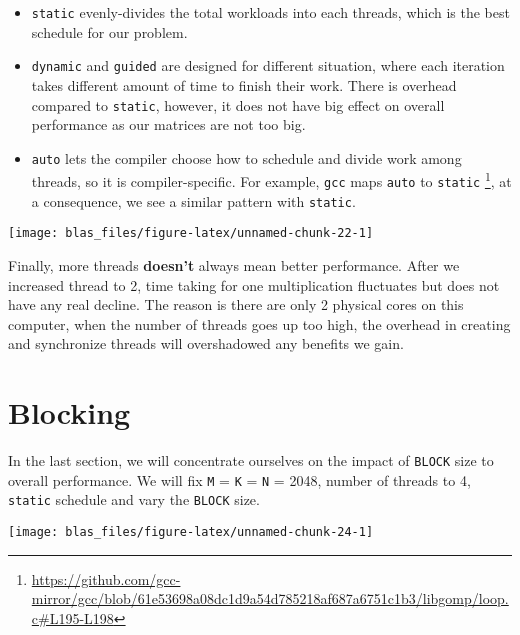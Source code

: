 \documentclass[
  12pt,
  xcolor = usenames,dvipsnames]{article}
\newcommand{\passthrough}[1]{#1}
\providecommand{\tightlist}{%
  \setlength{\itemsep}{0pt}\setlength{\parskip}{0pt}}
\begin{document}
\begin{itemize}
\tightlist
\item
  \passthrough{\lstinline!static!} evenly-divides the total workloads into each threads, which is the best schedule for our problem.
\item
  \passthrough{\lstinline!dynamic!} and \passthrough{\lstinline!guided!} are designed for different situation, where each iteration takes different amount of time to finish their work. There is overhead compared to \passthrough{\lstinline!static!}, however, it does not have big effect on overall performance as our matrices are not too big.
\item
  \passthrough{\lstinline!auto!} lets the compiler choose how to schedule and divide work among threads, so it is compiler-specific. For example, \passthrough{\lstinline!gcc!} maps \passthrough{\lstinline!auto!} to \passthrough{\lstinline!static!} \footnote{\url{https://github.com/gcc-mirror/gcc/blob/61e53698a08dc1d9a54d785218af687a6751c1b3/libgomp/loop.c\#L195-L198}}, at a consequence, we see a similar pattern with \passthrough{\lstinline!static!}.
\end{itemize}

\begin{center}\texttt{[image: blas\_files/figure-latex/unnamed-chunk-22-1]} \end{center}

Finally, more threads \textbf{doesn't} always mean better performance. After we increased thread to 2, time taking for one multiplication fluctuates but does not have any real decline. The reason is there are only 2 physical cores on this computer, when the number of threads goes up too high, the overhead in creating and synchronize threads will overshadowed any benefits we gain.

\hypertarget{blocking}{%
\section{Blocking}\label{blocking}}

In the last section, we will concentrate ourselves on the impact of \passthrough{\lstinline!BLOCK!} size to overall performance. We will fix \passthrough{\lstinline!M!} = \passthrough{\lstinline!K!} = \passthrough{\lstinline!N!} = 2048, number of threads to 4, \passthrough{\lstinline!static!} schedule and vary the \passthrough{\lstinline!BLOCK!} size.

\begin{center}\texttt{[image: blas\_files/figure-latex/unnamed-chunk-24-1]} \end{center}
\end{document}
